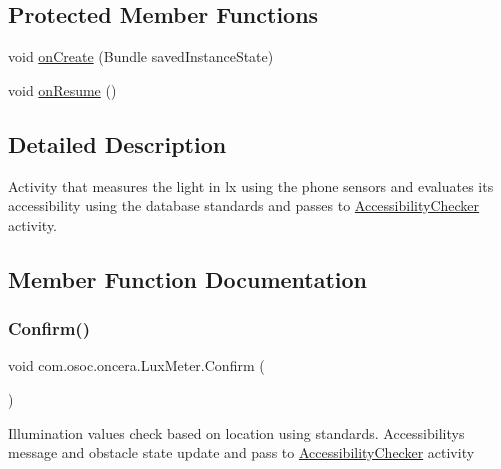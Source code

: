\subsection*{Protected Member Functions}
\begin{DoxyCompactItemize}
\item 
void \mbox{\hyperlink{classcom_1_1osoc_1_1oncera_1_1_lux_meter_a29325bd8ae0a741d85655bdc82119362}{on\+Create}} (Bundle saved\+Instance\+State)
\item 
void \mbox{\hyperlink{classcom_1_1osoc_1_1oncera_1_1_lux_meter_a00598d35cc0be971acfe11904f60f9ff}{on\+Resume}} ()
\end{DoxyCompactItemize}


\subsection{Detailed Description}
Activity that measures the light in lx using the phone sensors and evaluates its accessibility using the database standards and passes to \mbox{\hyperlink{classcom_1_1osoc_1_1oncera_1_1_accessibility_checker}{Accessibility\+Checker}} activity. 

\subsection{Member Function Documentation}
\mbox{\label{classcom_1_1osoc_1_1oncera_1_1_lux_meter_ab838cd3f14db334069325c11836b6df6}} 
\subsubsection{\texorpdfstring{Confirm()}{Confirm()}}
{\footnotesize\ttfamily void com.\+osoc.\+oncera.\+Lux\+Meter.\+Confirm (\begin{DoxyParamCaption}{ }\end{DoxyParamCaption})}

Illumination values check based on location using standards. Accessibility\textquotesingle{}s message and obstacle state update and pass to \mbox{\hyperlink{classcom_1_1osoc_1_1oncera_1_1_accessibility_checker}{Accessibility\+Checker}} activity \mbox{\label{classcom_1_1osoc_1_1oncera_1_1_lux_meter_a2faafc9b2da286b7c0aa3be82959073a}} 
